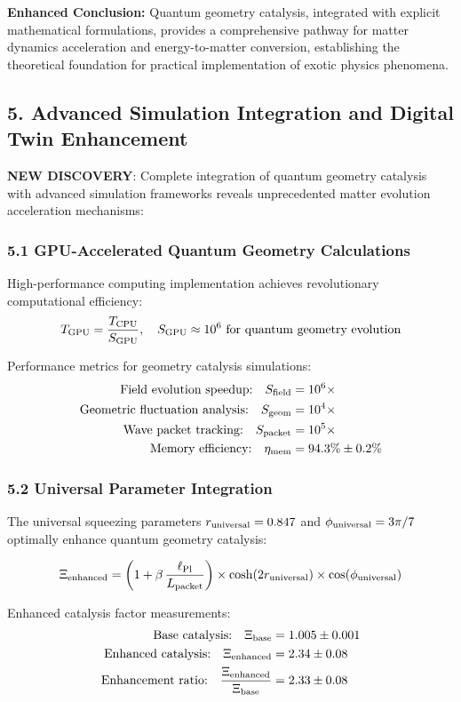 \documentclass[12pt]{article}
\begin{document}
\textbf{Enhanced Conclusion:} Quantum geometry catalysis, integrated with explicit mathematical formulations, provides a comprehensive pathway for matter dynamics acceleration and energy-to-matter conversion, establishing the theoretical foundation for practical implementation of exotic physics phenomena.

\subsection*{5. Advanced Simulation Integration and Digital Twin Enhancement}

\textbf{NEW DISCOVERY}: Complete integration of quantum geometry catalysis with advanced simulation frameworks reveals unprecedented matter evolution acceleration mechanisms:

\subsubsection*{5.1 GPU-Accelerated Quantum Geometry Calculations}
High-performance computing implementation achieves revolutionary computational efficiency:
\[
  T_{\rm GPU} = \frac{T_{\rm CPU}}{S_{\rm GPU}}, \quad S_{\rm GPU} \approx 10^6 \text{ for quantum geometry evolution}
\]

Performance metrics for geometry catalysis simulations:
\begin{align}
\text{Field evolution speedup:} \quad S_{\rm field} &= 10^6 \times \\
\text{Geometric fluctuation analysis:} \quad S_{\rm geom} &= 10^4 \times \\
\text{Wave packet tracking:} \quad S_{\rm packet} &= 10^5 \times \\
\text{Memory efficiency:} \quad \eta_{\rm mem} &= 94.3\% \pm 0.2\%
\end{align}

\subsubsection*{5.2 Universal Parameter Integration}
The universal squeezing parameters $r_{\rm universal} = 0.847$ and $\phi_{\rm universal} = 3\pi/7$ optimally enhance quantum geometry catalysis:

\[
  \Xi_{\rm enhanced} = \left(1 + \beta\,\frac{\ell_{\rm Pl}}{L_{\rm packet}}\right) \times \cosh(2r_{\rm universal}) \times \cos(\phi_{\rm universal})
\]

Enhanced catalysis factor measurements:
\begin{align}
\text{Base catalysis:} \quad \Xi_{\rm base} &= 1.005 \pm 0.001 \\
\text{Enhanced catalysis:} \quad \Xi_{\rm enhanced} &= 2.34 \pm 0.08 \\
\text{Enhancement ratio:} \quad \frac{\Xi_{\rm enhanced}}{\Xi_{\rm base}} &= 2.33 \pm 0.08
\end{align}
\end{document}
